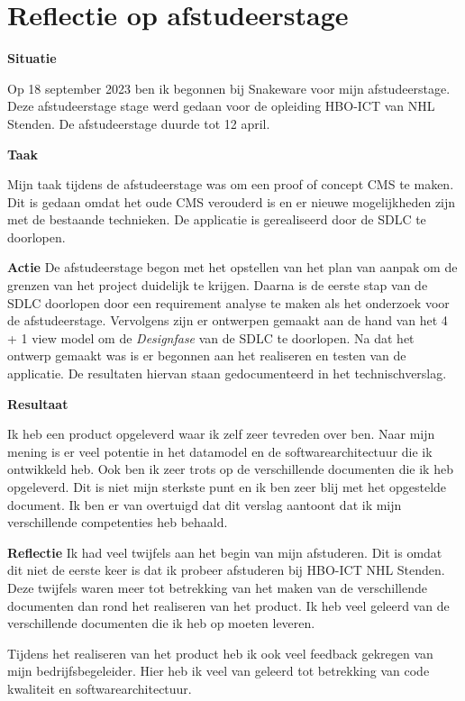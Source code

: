 \section{Reflectie op afstudeerstage}
\textbf{Situatie}

\whitespace
Op 18 september 2023 ben ik begonnen bij Snakeware voor mijn afstudeerstage.
Deze afstudeerstage stage werd gedaan voor de opleiding HBO-ICT van NHL Stenden.
De afstudeerstage duurde tot 12 april.

\whitespace
\textbf{Taak}

\whitespace
Mijn taak tijdens de afstudeerstage was om een proof of concept \gls{CMS} te maken.
Dit is gedaan omdat het oude CMS verouderd is en er nieuwe mogelijkheden zijn met de bestaande technieken.
De applicatie is gerealiseerd door de \gls{SDLC} te doorlopen.

\whitespace
\textbf{Actie}
De afstudeerstage begon met het opstellen van het plan van aanpak om de grenzen van het project duidelijk te krijgen.
Daarna is de eerste stap van de \gls{SDLC} doorlopen door een requirement analyse te maken als het onderzoek voor de afstudeerstage.
Vervolgens zijn er ontwerpen gemaakt aan de hand van het 4 + 1 view model om de \textit{Designfase} van de \gls{SDLC} te doorlopen. 
Na dat het ontwerp gemaakt was is er begonnen aan het realiseren en testen van de applicatie.
De resultaten hiervan staan gedocumenteerd in het technischverslag.

\whitespace
\textbf{Resultaat}

\whitespace
Ik heb een product opgeleverd waar ik zelf zeer tevreden over ben.
Naar mijn mening is er veel potentie in het datamodel en de softwarearchitectuur die ik ontwikkeld heb.
Ook ben ik zeer trots op de verschillende documenten die ik heb opgeleverd.
Dit is niet mijn sterkste punt en ik ben zeer blij met het opgestelde document.
Ik ben er van overtuigd dat dit verslag aantoont dat ik mijn verschillende competenties heb behaald.

\whitespace
\textbf{Reflectie}
Ik had veel twijfels aan het begin van mijn afstuderen.
Dit is omdat dit niet de eerste keer is dat ik probeer afstuderen bij HBO-ICT NHL Stenden.
Deze twijfels waren meer tot betrekking van het maken van de verschillende documenten dan rond het realiseren van het product.
Ik heb veel geleerd van de verschillende documenten die ik heb op moeten leveren.

\whitespace
Tijdens het realiseren van het product heb ik ook veel feedback gekregen van mijn bedrijfsbegeleider.
Hier heb ik veel van geleerd tot betrekking van code kwaliteit en softwarearchitectuur.
